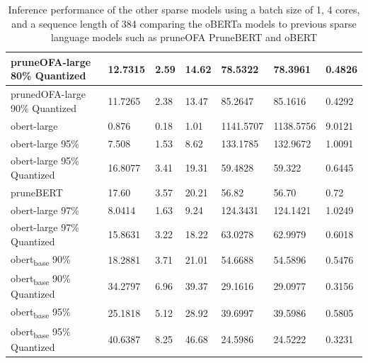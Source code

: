 \begin{table}[!ht]
{\begin{tabular}{|l|l|l|l|l|l|l|}
        pruneOFA-large 80\% Quantized & 12.7315 & 2.59 & 14.62 & 78.5322 & 78.3961 & 0.4826 \\ \hline
        prunedOFA-large 90\% Quantized & 11.7265 & 2.38 & 13.47 & 85.2647 & 85.1616 & 0.4292 \\ \hline
        obert-large  & 0.876 & 0.18 & 1.01 & 1141.5707 & 1138.5756 & 9.0121 \\ \hline
        obert-large 95\% & 7.508 & 1.53 & 8.62 & 133.1785 & 132.9672 & 1.0091 \\ \hline
        obert-large 95\% Quantized & 16.8077 & 3.41 & 19.31 & 59.4828 & 59.322 & 0.6445 \\ \hline
        pruneBERT & 17.60 & 3.57 & 20.21 & 56.82 & 56.70 & 0.72 \\ \hline
        obert-large 97\% & 8.0414 & 1.63 & 9.24 & 124.3431 & 124.1421 & 1.0249 \\ \hline
        obert-large 97\% Quantized & 15.8631 & 3.22 & 18.22 & 63.0278 & 62.9979 & 0.6018 \\ \hline
        obert\textsubscript{base} 90\% & 18.2881 & 3.71 & 21.01 & 54.6688 & 54.5896 & 0.5476 \\ \hline
        obert\textsubscript{base} 90\% Quantized & 34.2797 & 6.96 & 39.37 & 29.1616 & 29.0977 & 0.3156 \\ \hline
        obert\textsubscript{base} 95\%  & 25.1818 & 5.12 & 28.92 & 39.6997 & 39.5986 & 0.5805 \\ \hline
        obert\textsubscript{base} 95\% Quantized & 40.6387 & 8.25 & 46.68 & 24.5986 & 24.5222 & 0.3231 \\ \hline
    \end{tabular}}
    \caption{Inference performance of the other sparse models using a batch size of 1, 4 cores, and a sequence length of 384 comparing the oBERTa models to previous sparse language models such as pruneOFA \cite{Zafrir2021PruneOF} PruneBERT \cite{Sanh2020MovementPA} and oBERT \cite{Kurti2022TheOB}}
    \label{tab:inference-bs-1-core4-competitive}
\end{table}

